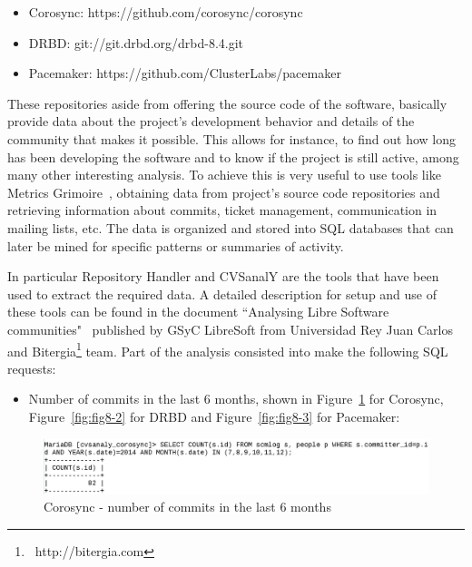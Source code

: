 \documentclass[a4paper, 12pt]{book}
\begin{document}
\begin{itemize}
	\item Corosync: https://github.com/corosync/corosync
	\item DRBD: git://git.drbd.org/drbd-8.4.git
	\item Pacemaker: https://github.com/ClusterLabs/pacemaker
\end{itemize}

\noindent These repositories aside from offering the source code of the software, basically provide data about the project's development behavior and details of the community that makes it possible. This allows for instance, to find out how long has been developing the software and to know if the project is still active, among many other interesting analysis. To achieve this is very useful to use tools like Metrics Grimoire~\cite{GSyC}, obtaining data from project's source code repositories and retrieving information about commits, ticket management, communication in mailing lists, etc. The data is organized and stored into SQL databases that can later be mined for specific patterns or summaries of activity. \bigskip

\noindent In particular Repository Handler and CVSanalY are the tools that have been used to extract the required data. A detailed description for setup and use of these tools can be found in the document ``Analysing Libre Software communities"~\cite{IandR} published by GSyC LibreSoft from Universidad Rey Juan Carlos and Bitergia\footnote{\ http://bitergia.com} team. Part of the analysis consisted into make the following SQL requests:

\begin{itemize}
      \item Number of commits in the last 6 months, shown in Figure~\ref{fig:fig8-1} for Corosync, Figure~\ref{fig:fig8-2} for DRBD and Figure~\ref{fig:fig8-3} for Pacemaker:
\end{itemize}

    \begin{figure}[H]
      \centering
      \includegraphics[scale=0.30]{fig8-1.png}
      \caption[Commits in the last 6 months for Corosync]{Corosync - number of commits in the last 6 months}
      \label{fig:fig8-1}
    \end{figure}
	  
\end{document}
